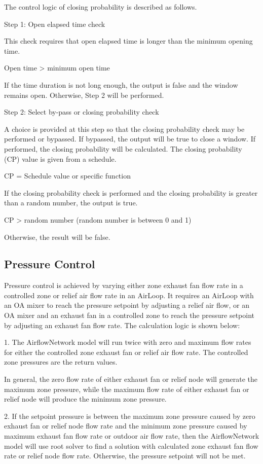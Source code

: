 The control logic of closing probability is described as follows.

Step 1: Open elapsed time check

This check requires that open elapsed time is longer than the minimum opening time.

Open time \textgreater{} minimum open time

If the time duration is not long enough, the output is false and the window remains open. Otherwise, Step 2 will be performed.

Step 2: Select by-pass or closing probability check

A choice is provided at this step so that the closing probability check may be performed or bypassed. If bypassed, the output will be true to close a window. If performed, the closing probability will be calculated. The closing probability (CP) value is given from a schedule.

CP = Schedule value or specific function

If the closing probability check is performed and the closing probability is greater than a random number, the output is true.

CP \textgreater{} random number (random number is between 0 and 1)

Otherwise, the result will be false.

\subsection{Pressure Control}\label{pressure-control}

Pressure control is achieved by varying either zone exhaust fan flow rate in a controlled zone or relief air flow rate in an AirLoop. It requires an AirLoop with an OA mixer to reach the pressure setpoint by adjusting a relief air flow, or an OA mixer and an exhaust fan in a controlled zone to reach the pressure setpoint by adjusting an exhaust fan flow rate. The calculation logic is shown below:

1. The AirflowNetwork model will run twice with zero and maximum flow rates for either the controlled zone exhaust fan or relief air flow rate. The controlled zone pressures are the return values.

	In general, the zero flow rate of either exhaust fan or relief node will generate the maximum zone pressure, while the maximum flow rate of either exhaust fan or relief node will produce the minimum zone pressure. 

2. If the setpoint pressure is between the maximum zone pressure caused by zero exhaust fan or relief node flow rate and the minimum zone pressure caused by maximum exhaust fan flow rate or outdoor air flow rate, then the AirflowNetwork model will use root solver to find a solution with calculated zone exhaust fan flow rate or relief node flow rate. Otherwise, the pressure setpoint will not be met. 

